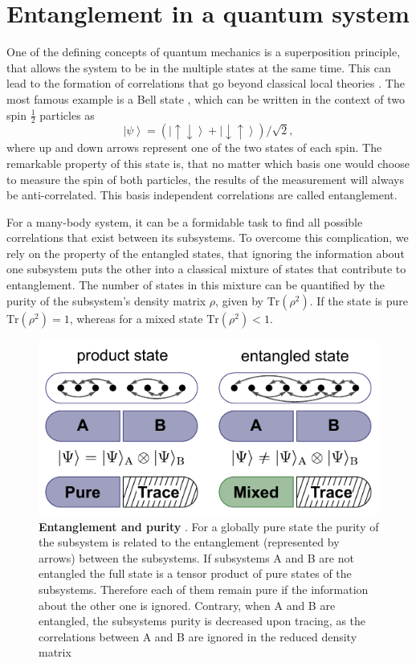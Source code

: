 \section{Entanglement in a quantum system}
One of the defining concepts of quantum mechanics is a superposition principle, that allows the system to be in the multiple states at the same time. This can lead to the formation of correlations that go beyond classical local theories \cite{Rev. Mod. Phys., 81:865, 2009}. The most famous example is a Bell state \cite{Physics, 1:195, 1964}, which can be written in the context of two spin $\frac{1}{2}$ particles as 
\begin{equation}
\left| \psi \right>=(\left| \uparrow \downarrow \right>+ \left| \downarrow \uparrow \right>)/\sqrt{2},
\end{equation}
where up and down arrows represent one of the two states of each spin. The remarkable property of this state is, that no matter which basis one would choose to measure the spin of both particles, the results of the measurement will always be anti-correlated. This basis independent correlations are called entanglement.

For a many-body system, it can be a formidable task to find all possible correlations that exist between its subsystems. To overcome this complication, we rely on the property of the entangled states, that ignoring the information about one subsystem puts the other into a classical mixture of states that contribute to entanglement. The number of states in this mixture can be quantified by the purity of the subsystem's density matrix $\rho$, given by $\textrm{Tr}(\rho^2)$. If the state is pure $\textrm{Tr}(\rho^2)=1$, whereas for a mixed state $\textrm{Tr}(\rho^2)<1$.

\begin{figure}[t!]
	\centering
	\includegraphics[scale=1]{figures/ETH_entanglemet.pdf}
	\caption{{\bf Entanglement and purity }. For a globally pure state the purity of the subsystem is related to the entanglement (represented by arrows) between the subsystems. If subsystems A and B are not entangled the full state is a tensor product of pure states of the subsystems. Therefore each of them remain pure if the information about the other one is ignored. Contrary, when A and B are entangled, the subsystems purity is decreased upon tracing, as the correlations between A and B are ignored in the reduced density matrix }
	\label{fig:ETH_entanglemet}
\end{figure}  

